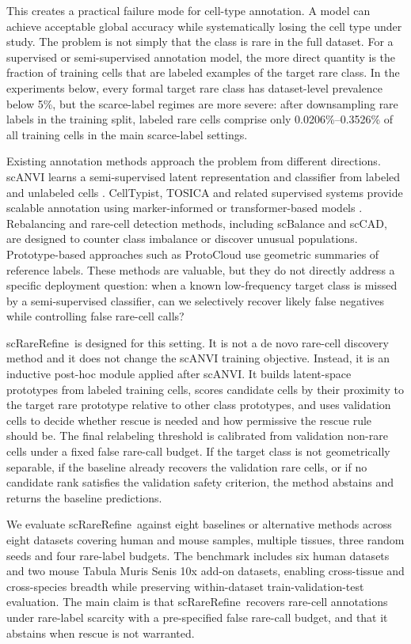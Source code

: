 \documentclass[11pt]{article}
\newcommand{\method}{scRareRefine}
\begin{document}
This creates a practical failure mode for cell-type annotation. A model can
achieve acceptable global accuracy while systematically losing the cell type
under study. The problem is not simply that the class is rare in the full
dataset. For a supervised or semi-supervised annotation model, the more direct
quantity is the fraction of training cells that are labeled examples of the
target rare class. In the experiments below, every formal target rare class has
dataset-level prevalence below 5\%, but the scarce-label regimes are more
severe: after downsampling rare labels in the training split, labeled rare
cells comprise only 0.0206\%--0.3526\% of all training cells in the main
scarce-label settings.

Existing annotation methods approach the problem from different directions.
scANVI learns a semi-supervised latent representation and classifier from
labeled and unlabeled cells \citep{lopez2018scvi,xu2021scanvi}. CellTypist,
TOSICA and related supervised systems provide scalable annotation using
marker-informed or transformer-based models \citep{dominguez2022celltypist,chen2023tosica}.
Rebalancing and rare-cell detection methods, including scBalance and scCAD, are
designed to counter class imbalance or discover unusual populations.
Prototype-based approaches such as ProtoCloud use geometric summaries of
reference labels. These methods are valuable, but they do not directly address
a specific deployment question: when a known low-frequency target class is
missed by a semi-supervised classifier, can we selectively recover likely false
negatives while controlling false rare-cell calls?

\method\ is designed for this setting. It is not a de novo rare-cell discovery
method and it does not change the scANVI training objective. Instead, it is an
inductive post-hoc module applied after scANVI. It builds latent-space
prototypes from labeled training cells, scores candidate cells by their
proximity to the target rare prototype relative to other class prototypes, and
uses validation cells to decide whether rescue is needed and how permissive the
rescue rule should be. The final relabeling threshold is calibrated from
validation non-rare cells under a fixed false rare-call budget. If the target
class is not geometrically separable, if the baseline already recovers the
validation rare cells, or if no candidate rank satisfies the validation safety
criterion, the method abstains and returns the baseline predictions.

We evaluate \method\ against eight baselines or alternative methods across
eight datasets covering human and mouse samples, multiple tissues, three random
seeds and four rare-label budgets. The benchmark includes six human datasets
and two mouse Tabula Muris Senis 10x add-on datasets, enabling cross-tissue and
cross-species breadth while preserving within-dataset train-validation-test
evaluation. The main claim is that \method\ recovers rare-cell annotations
under rare-label scarcity with a pre-specified false rare-call budget, and that
it abstains when rescue is not warranted.
\end{document}

